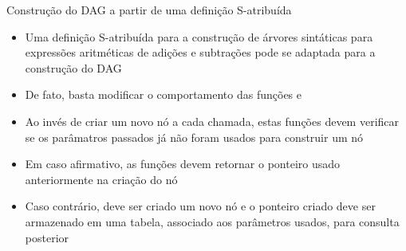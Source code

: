 \begin{frame}[fragile]{Construção do DAG a partir de uma definição S-atribuída}

    \begin{itemize}
        \item Uma definição S-atribuída para a construção de árvores sintáticas para expressões aritméticas de adições e subtrações pode se adaptada para a 
            construção do DAG

        \item De fato, basta modificar o comportamento das funções  e 

        \item Ao invés de criar um novo nó a cada chamada, estas funções devem verificar se os parâmatros passados já não foram usados para construir um nó

        \item Em caso afirmativo, as funções devem retornar o ponteiro usado anteriormente na criação do nó

        \item Caso contrário, deve ser criado um novo nó e o ponteiro criado deve ser armazenado em uma tabela, associado aos parâmetros usados, para consulta
            posterior
    \end{itemize}

\end{frame}


